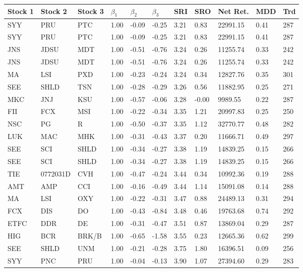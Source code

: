 \documentclass[11pt,a4,twosided,singlespacing,titlepagenumber=on]{scrreprt}
\numberwithin{equation}{chapter} %
\theoremstyle{remark}
\begin{document}
\begin{table}[H]
\centering
\begin{tabular}{lllllllllll}
\hline
Stock 1 & Stock 2 & Stock 3 & $\beta_1$ & $\beta_2$ & $\beta_3$ & SRI & SRO & Net Ret. & MDD & Trd\\ \hline
SYY  & PRU  & PTC  & 1.00 & -0.09 & -0.25 & 3.21 & 0.83 & 22991.15 & 0.41 & 287 \\
SYY  & PRU  & PTC  & 1.00 & -0.09 & -0.25 & 3.21 & 0.83 & 22991.15 & 0.41 & 287 \\
JNS  & JDSU  & MDT  & 1.00 & -0.51 & -0.76 & 3.24 & 0.26 & 11255.74 & 0.33 & 242 \\
JNS  & JDSU  & MDT  & 1.00 & -0.51 & -0.76 & 3.24 & 0.26 & 11255.74 & 0.33 & 242 \\
MA  & LSI  & PXD  & 1.00 & -0.23 & -0.24 & 3.24 & 0.34 & 12827.76 & 0.35 & 301 \\
SEE  & SHLD  & TSN  & 1.00 & -0.28 & -0.29 & 3.26 & 0.56 & 11882.95 & 0.25 & 271 \\
MKC  & JNJ  & KSU  & 1.00 & -0.57 & -0.06 & 3.28 & -0.00 & 9989.55 & 0.22 & 287 \\
FII  & FCX  & MSI  & 1.00 & -0.22 & -0.34 & 3.35 & 1.21 & 20997.83 & 0.25 & 250 \\
NSC  & PG  & R  & 1.00 & -0.50 & -0.37 & 3.35 & 1.12 & 32770.77 & 0.48 & 282 \\
LUK  & MAC  & MHK  & 1.00 & -0.31 & -0.43 & 3.37 & 0.20 & 11666.71 & 0.49 & 297 \\
SEE  & SCI  & SHLD  & 1.00 & -0.34 & -0.27 & 3.38 & 1.19 & 14839.25 & 0.15 & 266 \\
SEE  & SCI  & SHLD  & 1.00 & -0.34 & -0.27 & 3.38 & 1.19 & 14839.25 & 0.15 & 266 \\
TIE  & 0772031D  & CVH  & 1.00 & -0.47 & -0.24 & 3.44 & 0.34 & 10992.36 & 0.19 & 288 \\
AMT  & AMP  & CCI  & 1.00 & -0.16 & -0.49 & 3.44 & 1.14 & 15091.08 & 0.14 & 288 \\
MA  & LSI  & OXY  & 1.00 & -0.22 & -0.31 & 3.47 & 0.88 & 24489.13 & 0.31 & 294 \\
FCX  & DIS  & DO  & 1.00 & -0.43 & -0.84 & 3.48 & 0.46 & 19763.68 & 0.74 & 292 \\
ETFC  & DDR  & DE  & 1.00 & -0.31 & -0.47 & 3.51 & 0.87 & 13869.04 & 0.29 & 287 \\
HIG  & BCR  & BRK/B  & 1.00 & -0.65 & -1.58 & 3.55 & 0.23 & 12665.36 & 0.62 & 299 \\
SEE  & SHLD  & UNM  & 1.00 & -0.21 & -0.28 & 3.75 & 1.80 & 16396.51 & 0.09 & 256 \\
SYY  & PNC  & PRU  & 1.00 & -0.04 & -0.13 & 3.90 & 1.07 & 27394.60 & 0.29 & 283 \\
\hline
\end{tabular}
\end{table}
\end{document}
